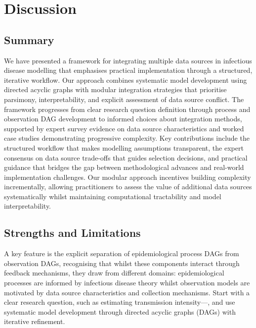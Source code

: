 \documentclass{article}
\begin{document}
\section{Discussion}

\subsection{Summary}

We have presented a framework for integrating multiple data sources in infectious disease modelling that emphasises practical implementation through a structured, iterative workflow.
Our approach combines systematic model development using directed acyclic graphs with modular integration strategies that prioritise parsimony, interpretability, and explicit assessment of data source conflict.
The framework progresses from clear research question definition through process and observation DAG development to informed choices about integration methods, supported by expert survey evidence on data source characteristics and worked case studies demonstrating progressive complexity.
Key contributions include the structured workflow that makes modelling assumptions transparent, the expert consensus on data source trade-offs that guides selection decisions, and practical guidance that bridges the gap between methodological advances and real-world implementation challenges.
Our modular approach incentives building complexity incrementally, allowing practitioners to assess the value of additional data sources systematically whilst maintaining computational tractability and model interpretability.

\subsection{Strengths and Limitations}

A key feature is the explicit separation of epidemiological process DAGs from observation DAGs, recognising that whilst these components interact through feedback mechanisms, they draw from different domains: epidemiological processes are informed by infectious disease theory whilst observation models are motivated by data source characteristics and collection mechanisms.
Start with a clear research question, such as estimating transmission intensity—, and use systematic model development through directed acyclic graphs (DAGs) with iterative refinement.
\end{document}
